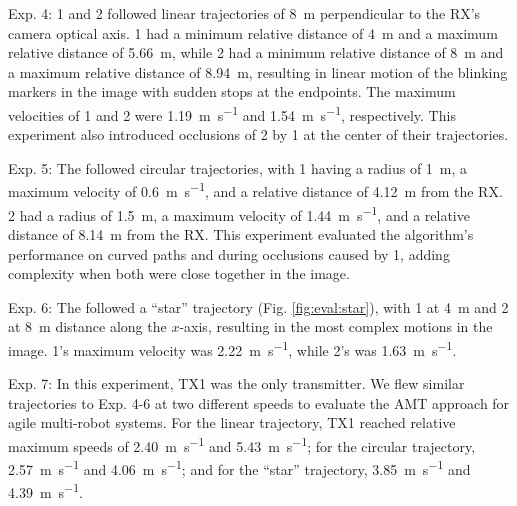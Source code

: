 \documentclass[lettersize,preprint]{elsarticle}
\begin{document}
Exp. 4: 1 and 2 followed linear trajectories of \SI{8}{\meter} perpendicular to the \gls{RX}'s camera optical axis.
1 had a minimum relative distance of \SI{4}{\meter} and a maximum relative distance of \SI{5.66}{\meter}, while 2 had a minimum relative distance of \SI{8}{\meter} and a maximum relative distance of \SI{8.94}{\meter}, resulting in linear motion of the blinking markers in the image with sudden stops at the endpoints.
The maximum velocities of 1 and 2 were \SI{1.19}{\meter\per\second} and \SI{1.54}{\meter\per\second}, respectively.
This experiment also introduced occlusions of 2 by 1 at the center of their trajectories.

Exp. 5: The  followed circular trajectories, with 1 having a radius of \SI{1}{\meter}, a maximum velocity of \SI{0.6}{\meter\per\second}, and a relative distance of \SI{4.12}{\meter} from the \gls{RX}.
2 had a radius of \SI{1.5}{\meter}, a maximum velocity of \SI{1.44}{\meter\per\second}, and a relative distance of \SI{8.14}{\meter} from the \gls{RX}.
This experiment evaluated the algorithm's performance on curved paths and during occlusions caused by 1, adding complexity when both  were close together in the image.

Exp. 6: The  followed a \enquote{star} trajectory (Fig. \ref{fig:eval:star}), with 1 at \SI{4}{\meter} and 2 at \SI{8}{\meter} distance along the $x$-axis, resulting in the most complex motions in the image. 
1's maximum velocity was \SI{2.22}{\meter\per\second}, while 2's was \SI{1.63}{\meter\per\second}.

Exp. 7: In this experiment, \gls{TX}1 was the only transmitter. We flew similar trajectories to Exp. 4-6 at two different speeds to evaluate the \gls{AMT} approach for agile multi-robot systems. 
For the linear trajectory, \gls{TX}1 reached relative maximum speeds of \SI{2.40}{\meter\per\second} and \SI{5.43}{\meter\per\second}; for the circular trajectory, \SI{2.57}{\meter\per\second} and \SI{4.06}{\meter\per\second}; and for the “star” trajectory, \SI{3.85}{\meter\per\second} and \SI{4.39}{\meter\per\second}.
\end{document}
